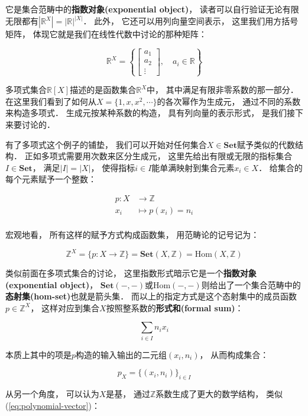 \documentclass[10pt, openany]{book}
\begin{document}
它是集合范畴中的\textbf{指数对象(exponential object)}，
读者可以自行验证无论有限无限都有$|\mathbb R^X| = |\mathbb R| ^ {|X|}$．
此外，
它还可以用列向量空间表示，
这里我们用方括号矩阵，
体现它就是我们在线性代数中讨论的那种矩阵：

$$
\mathbb R^X = \left\{ \begin{bmatrix} a_1 \\ a_2 \\ \vdots \end{bmatrix}, \quad a_i \in \mathbb R \right\}
$$

多项式集合$\mathbb R[X]$描述的是函数集合$\mathbb R^X$中，
其中满足有限非零系数的那一部分．
在这里我们看到了如何从$X = \{1,x,x^2,\cdots\}$的各次幂作为生成元，
通过不同的系数来构造多项式．
生成元按某种系数的构造，
具有列向量的表示形式，
是我们接下来要讨论的．

有了多项式这个例子的铺垫，
我们可以开始对任何集合$X\in\textbf{Set}$赋予类似的代数结构．
正如多项式需要用次数来区分生成元，
这里先给出有限或无限的指标集合$I\in\textbf{Set}$，
满足$|I| = |X|$，
使得指标$i\in I$能单满映射到集合元素$x_i\in X$．
给集合的每个元素赋予一个整数：

$$
\begin{aligned}
p: X &\to \mathbb Z \\
x_i &\mapsto p(x_i) = n_i \\
\end{aligned}
$$

宏观地看，
所有这样的赋予方式构成函数集，
用范畴论的记号记为：

$$
\mathbb Z^X = \{p: X \to \mathbb Z\} = \textbf{Set}(X,\mathbb Z) = \text{Hom}(X,\mathbb Z) 
$$

类似前面在多项式集合的讨论，
这里指数形式暗示它是一个\textbf{指数对象(exponential object)}，
$\textbf{Set}(-,-)$或$\text{Hom}(-,-)$则给出了一个集合范畴中的\textbf{态射集(hom-set)}也就是箭头集．
而以上的指定方式是这个态射集中的成员函数$p\in \mathbb Z^X$，
这样对应到集合$X$按照整系数的\textbf{形式和(formal sum)}：

$$
\sum_{i\in I} n_i x_i
$$

本质上其中的项是$p$构造的输入输出的二元组$(x_i,n_i)$，
从而构成集合：

$$
p_X = \{ (x_i,n_i) \}_{i\in I}
$$

从另一个角度，
可以认为$X$是基，
通过$\mathbb Z$系数生成了更大的数学结构，
类似(\ref{eq:polynomial-vector})：
\end{document}
